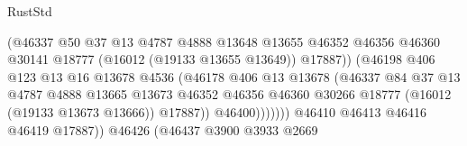 \begin{lexlean}{RustStd}
\begin{coremodule}
                                            (@46337
                                              @50
                                              @37
                                              @13
                                              @4787
                                              @4888
                                              @13648
                                              @13655
                                              @46352
                                              @46356
                                              @46360
                                              @30141
                                              @18777
                                              (@16012 (@19133 @13655 @13649))
                                              @17887))
                                          (@46198
                                            @406
                                            @123
                                            @13
                                            @16
                                            @13678
                                            @4536
                                            (@46178
                                              @406
                                              @13
                                              @13678
                                              (@46337
                                                @84
                                                @37
                                                @13
                                                @4787
                                                @4888
                                                @13665
                                                @13673
                                                @46352
                                                @46356
                                                @46360
                                                @30266
                                                @18777
                                                (@16012 (@19133 @13673 @13666))
                                                @17887))
                                            @46400)))))))
                              @46410
                              @46413
                              @46416
                              @46419
                              @17887))
                          @46426
                          (@46437
                            @3900
                            @3933
                            @2669

\end{coremodule}
\end{lexlean}
